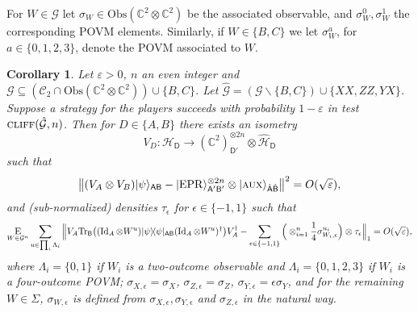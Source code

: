 \documentclass[11pt]{article}
\newtheorem{corollary}[theorem]{Corollary}
\theoremstyle{remark}
\theoremstyle{definition}
\newcommand{\ket}[1]{|#1\rangle}
\newcommand{\bra}[1]{\langle#1|}
\newcommand{\proj}[1]{\ket{#1}\!\bra{#1}}
\newcommand{\Tr}{\mbox{\rm Tr}}
\newcommand{\Id}{\ensuremath{\mathop{\rm Id}\nolimits}}
\newcommand{\Es}[1]{\ensuremath{\mathop{\textsc{E}}_{#1}}}
\newcommand{\reg}[1]{{\textsf{#1}}}
\newcommand{\C}{\ensuremath{\mathbb{C}}}
\newcommand{\mH}{\mathcal{H}}
\newcommand{\setft}[1]{\mathrm{#1}}
\newcommand{\Obs}{\setft{Obs}}
\newcommand{\eps}{\varepsilon}
\newcommand{\EPR}{{\rm EPR}}
\newcommand{\aux}{\textsc {aux}}
\newcommand{\cliff}{\textsc{cliff}}
\newcommand{\cliffordgb}{{\mathcal{C}_2}}
\begin{document}
For $W\in\mathcal{G}$ let $\sigma_W \in \Obs(\C^2 \otimes \C^2)$ be the associated observable, and $\sigma_W^0,\sigma_W^1$ the corresponding POVM elements. Similarly, if $W\in\{B,C\}$ we let $\sigma_W^a$, for $a\in\{0,1,2,3\}$, denote the POVM associated to $W$. 

\begin{corollary}\label{cor:clifford-rigid}
Let $\eps>0$, $n$ an even integer and $\mathcal{G} \subseteq (\cliffordgb \cap \Obs(\C^2 \otimes \C^2))\cup\{B,C\}$. Let $\hat{\mathcal{G}} = (\mathcal{G}\backslash\{B,C\}) \cup \{XX,ZZ,YX\}$. Suppose a strategy for the players succeeds with probability $1-\eps$ in test $\cliff(\hat{\mathcal{G}},n)$. Then for $D\in\{A,B\}$ there exists an isometry 
$$V_D: \mathcal{H}_\reg{D} \to (\C^2)^{\otimes 2n}_{\reg{D}'} \otimes \hat{\mH}_{\reg{D}}$$
such that
$$ \big\| (V_A \otimes V_B) \ket{\psi}_{\reg{AB}}  - \ket{\EPR}^{\otimes 2n}_{\reg{A}'\reg{B}'} \otimes \ket{\aux}_{\hat{\reg{A}}\hat{\reg{B}}} \big\|^2 = O(\sqrt{\eps}),$$
and (sub-normalized) densities $\tau_\epsilon$ for $\epsilon\in\{-1,1\}$ such that
$$ \Es{W\in\mathcal{G}^n} \sum_{u\in\prod_i \Lambda_i} \Big\| V_A \Tr_{\reg{B}}\big((\Id_A \otimes W^u) \proj{\psi}_{\reg{AB}} (\Id_A \otimes W^u)^\dagger\big) V_A^\dagger - \sum_{\epsilon\in\{-1,1\}} \Big( \otimes_{i=1}^n \frac{1}{4}\sigma_{W_i,\epsilon}^{u_i}\Big)\otimes \tau_\epsilon   \Big\|_1 = O(\sqrt{\eps}),$$
where $\Lambda_i = \{0,1\}$ if $W_i$ is a two-outcome observable and $\Lambda_i=\{0,1,2,3\}$ if $W_i$ is a four-outcome POVM; $\sigma_{X,\epsilon}=\sigma_X$, $\sigma_{Z,\epsilon} = \sigma_Z$, $\sigma_{Y,\epsilon} = \epsilon \sigma_Y$, and for the remaining $W\in\Sigma$, $\sigma_{W,\epsilon}$ is defined from $\sigma_{X,\epsilon},\sigma_{Y,\epsilon}$ and $\sigma_{Z,\epsilon}$ in the natural way. 
\end{corollary}
\end{document}
